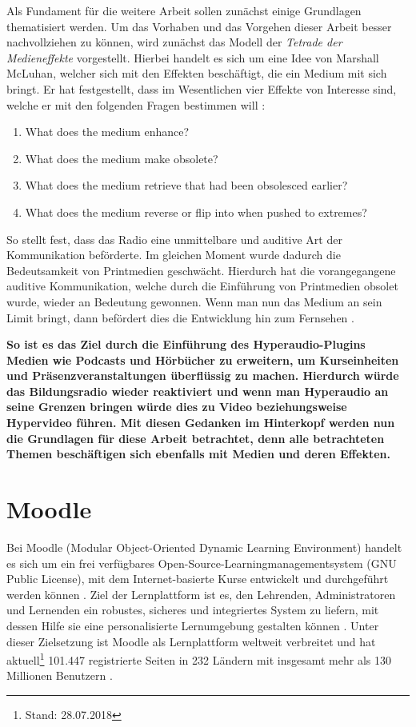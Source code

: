 \label{cha:grundlagen}
Als Fundament für die weitere Arbeit sollen zunächst einige Grundlagen thematisiert werden. Um das Vorhaben und das Vorgehen dieser Arbeit besser nachvollziehen zu können, wird zunächst das Modell der \textit{Tetrade der Medieneffekte} vorgestellt. Hierbei handelt es sich um eine Idee von Marshall McLuhan, welcher sich mit den Effekten beschäftigt, die ein Medium mit sich bringt. Er hat festgestellt, dass im Wesentlichen vier Effekte von Interesse sind, welche er mit den folgenden Fragen bestimmen will \citep{mcluhan1977laws}:

\begin{enumerate}
\item What does the medium enhance?
\item What does the medium make obsolete?
\item What does the medium retrieve that had been obsolesced earlier?
\item What does the medium reverse or flip into when pushed to extremes?
\end{enumerate}

So stellt \cite{mcluhan1977laws} fest, dass das Radio eine unmittelbare und auditive Art der Kommunikation beförderte. Im gleichen Moment wurde dadurch die Bedeutsamkeit von Printmedien geschwächt. Hierdurch hat die vorangegangene auditive Kommunikation, welche durch die Einführung von Printmedien obsolet wurde, wieder an Bedeutung gewonnen. Wenn man nun das Medium an sein Limit bringt, dann befördert dies die Entwicklung hin zum Fernsehen \citep{mcluhan1977laws}.

\textbf{So ist es das Ziel durch die Einführung des Hyperaudio-Plugins Medien wie Podcasts und Hörbücher zu erweitern, um Kurseinheiten und Präsenzveranstaltungen überflüssig zu machen. Hierdurch würde das Bildungsradio wieder reaktiviert und wenn man Hyperaudio an seine Grenzen bringen würde dies zu Video beziehungsweise Hypervideo führen. Mit diesen Gedanken im Hinterkopf werden nun die Grundlagen für diese Arbeit betrachtet, denn alle betrachteten Themen beschäftigen sich ebenfalls mit Medien und deren Effekten.}


\section{Moodle}
\label{sec:moodle}
Bei Moodle (Modular Object-Oriented Dynamic Learning Environment) handelt es sich um ein frei verfügbares Open-Source-Learningmanagementsystem (GNU Public License), mit dem Internet-basierte Kurse entwickelt und durchgeführt werden können \citep{moodle2015was}. Ziel der Lernplattform ist es, den Lehrenden, Administratoren und Lernenden ein robustes, sicheres und integriertes System zu liefern, mit dessen Hilfe sie eine personalisierte Lernumgebung gestalten können \citep{moodle2018about}. Unter dieser Zielsetzung ist Moodle als Lernplattform weltweit verbreitet und hat aktuell\footnote{Stand: 28.07.2018} 101.447 registrierte Seiten in 232 Ländern mit insgesamt mehr als 130 Millionen Benutzern \citep{moodle2018stats}.

